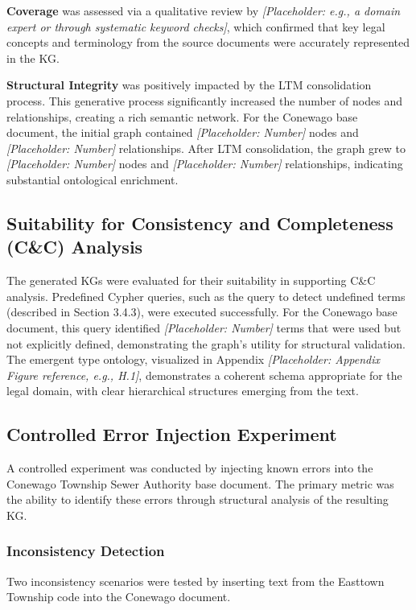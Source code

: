 \textbf{Coverage} was assessed via a qualitative review by \textit{[Placeholder: e.g., a domain expert or through systematic keyword checks]}, which confirmed that key legal concepts and terminology from the source documents were accurately represented in the KG.

\textbf{Structural Integrity} was positively impacted by the LTM consolidation process. This generative process significantly increased the number of nodes and relationships, creating a rich semantic network. For the Conewago base document, the initial graph contained \textit{[Placeholder: Number]} nodes and \textit{[Placeholder: Number]} relationships. After LTM consolidation, the graph grew to \textit{[Placeholder: Number]} nodes and \textit{[Placeholder: Number]} relationships, indicating substantial ontological enrichment.

\subsection{Suitability for Consistency and Completeness (C\&C) Analysis}
\label{subsec:candc_suitability}
The generated KGs were evaluated for their suitability in supporting C\&C analysis. Predefined Cypher queries, such as the query to detect undefined terms (described in Section 3.4.3), were executed successfully. For the Conewago base document, this query identified \textit{[Placeholder: Number]} terms that were used but not explicitly defined, demonstrating the graph's utility for structural validation. The emergent type ontology, visualized in Appendix \textit{[Placeholder: Appendix Figure reference, e.g., H.1]}, demonstrates a coherent schema appropriate for the legal domain, with clear hierarchical structures emerging from the text.

\subsection{Controlled Error Injection Experiment}
\label{subsec:error_injection}
A controlled experiment was conducted by injecting known errors into the Conewago Township Sewer Authority base document. The primary metric was the ability to identify these errors through structural analysis of the resulting KG.

\subsubsection{Inconsistency Detection}
Two inconsistency scenarios were tested by inserting text from the Easttown Township code into the Conewago document.

